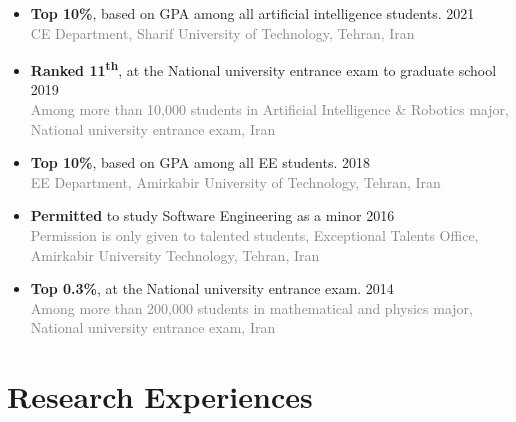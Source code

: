 \documentclass[11pt,a4paper,roman]{moderncv} %
\begin{document}
\begin{itemize}
	\item \textbf{Top 10\%}, based on GPA among all artificial intelligence students. \hfill 2021 \\
	\small{\textcolor{gray}{CE Department, Sharif University of Technology, Tehran, Iran}}
	
	\vspace{3pt}
	
	\item \textbf{Ranked 11\textsuperscript{th}}, at the National university entrance exam to graduate school \hfill 2019 \\
	\small{\textcolor{gray}{Among more than 10,000 students in Artificial Intelligence \& Robotics major, National university entrance exam, Iran}}
	
	\vspace{3pt}
	
	\item \textbf{Top 10\%}, based on GPA among all EE students. \hfill 2018 \\
	\small{\textcolor{gray}{EE Department, Amirkabir University of Technology, Tehran, Iran}}
	
	\vspace{3pt}
	
	\item \textbf{Permitted} to study Software Engineering as a minor \hfill 2016 \\
	\small{\textcolor{gray}{Permission is only given to talented students, Exceptional Talents Office, Amirkabir University Technology, Tehran, Iran}}
	
	\vspace{3pt}
	
	\item \textbf{Top 0.3\%}, at the National university entrance exam. \hfill 2014 \\
	\small{\textcolor{gray}{Among more than 200,000 students in mathematical and physics major, National university entrance exam, Iran}}
\end{itemize}

\section{Research Experiences}
\end{document}
